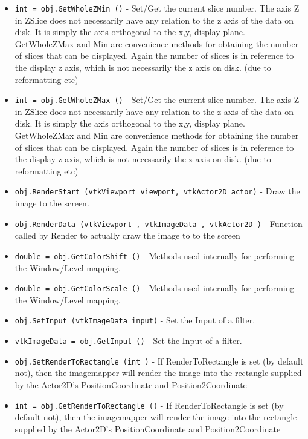 \begin{itemize}
\item  \verb|int = obj.GetWholeZMin ()| -  Set/Get the current slice number. The axis Z in ZSlice does not
 necessarily have any relation to the z axis of the data on disk.
 It is simply the axis orthogonal to the x,y, display plane.
 GetWholeZMax and Min are convenience methods for obtaining
 the number of slices that can be displayed. Again the number
 of slices is in reference to the display z axis, which is not
 necessarily the z axis on disk. (due to reformatting etc)

\item  \verb|int = obj.GetWholeZMax ()| -  Set/Get the current slice number. The axis Z in ZSlice does not
 necessarily have any relation to the z axis of the data on disk.
 It is simply the axis orthogonal to the x,y, display plane.
 GetWholeZMax and Min are convenience methods for obtaining
 the number of slices that can be displayed. Again the number
 of slices is in reference to the display z axis, which is not
 necessarily the z axis on disk. (due to reformatting etc)

\item  \verb|obj.RenderStart (vtkViewport viewport, vtkActor2D actor)| -  Draw the image to the screen.

\item  \verb|obj.RenderData (vtkViewport , vtkImageData , vtkActor2D )| -  Function called by Render to actually draw the image to to the screen

\item  \verb|double = obj.GetColorShift ()| -  Methods used internally for performing the Window/Level mapping.

\item  \verb|double = obj.GetColorScale ()| -  Methods used internally for performing the Window/Level mapping.

\item  \verb|obj.SetInput (vtkImageData input)| -  Set the Input of a filter. 

\item  \verb|vtkImageData = obj.GetInput ()| -  Set the Input of a filter. 

\item  \verb|obj.SetRenderToRectangle (int )| -  If RenderToRectangle is set (by default not), then the imagemapper
 will render the image into the rectangle supplied by the Actor2D's
 PositionCoordinate and Position2Coordinate

\item  \verb|int = obj.GetRenderToRectangle ()| -  If RenderToRectangle is set (by default not), then the imagemapper
 will render the image into the rectangle supplied by the Actor2D's
 PositionCoordinate and Position2Coordinate


\end{itemize}
